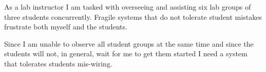 As a lab instructor I am tasked with overseeing and assisting six lab groups of three students concurrently.  Fragile systems that do not tolerate student mistakes
frustrate both myself and the students.
\bigskip

Since I am unable to observe all student groups at the same time and since the students will not, in general, 
wait for me to get them started I need a system that tolerates students mis-wiring.
\bigskip